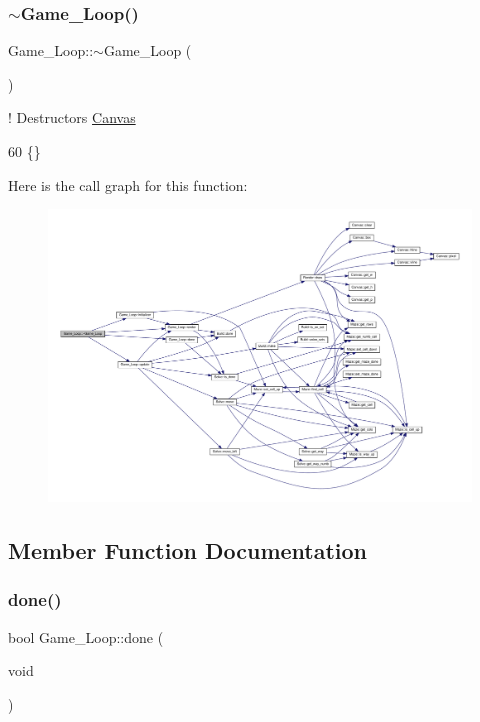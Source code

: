 \subsubsection{\texorpdfstring{$\sim$\+Game\+\_\+\+Loop()}{~Game\_Loop()}}
{\footnotesize\ttfamily Game\+\_\+\+Loop\+::$\sim$\+Game\+\_\+\+Loop (\begin{DoxyParamCaption}{ }\end{DoxyParamCaption})\hspace{0.3cm}{\ttfamily [inline]}}



! Destructors \hyperlink{classCanvas}{Canvas} 


\begin{DoxyCode}
60 \{\}
\end{DoxyCode}
Here is the call graph for this function\+:\nopagebreak
\begin{figure}[H]
\begin{center}
\leavevmode
\includegraphics[width=350pt]{classGame__Loop_a874fb59c1f7dc60273fc5541046838b9_cgraph}
\end{center}
\end{figure}


\subsection{Member Function Documentation}
\mbox{\label{classGame__Loop_a197233063165098c509b47d9b1da3a36}} 
\subsubsection{\texorpdfstring{done()}{done()}}
{\footnotesize\ttfamily bool Game\+\_\+\+Loop\+::done (\begin{DoxyParamCaption}\item[{void}]{ }\end{DoxyParamCaption})}



